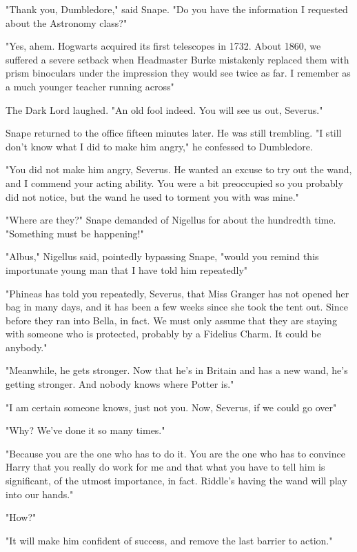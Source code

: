 "Thank you, Dumbledore," said Snape. "Do you have the information I requested about the Astronomy class?"

"Yes, ahem. Hogwarts acquired its first telescopes in 1732. About 1860, we suffered a severe setback when Headmaster Burke mistakenly replaced them with prism binoculars under the impression they would see twice as far. I remember as a much younger teacher running across{\el}"

The Dark Lord laughed. "An old fool indeed. You will see us out, Severus."

Snape returned to the office fifteen minutes later. He was still trembling. "I still don't know what I did to make him angry," he confessed to Dumbledore.

"You did not make him angry, Severus. He wanted an excuse to try out the wand, and I commend your acting ability. You were a bit preoccupied so you probably did not notice, but the wand he used to torment you with was mine."

\sbreak

"Where are they?" Snape demanded of Nigellus for about the hundredth time. "Something must be happening!"

"Albus," Nigellus said, pointedly bypassing Snape, "would you remind this importunate young man that I have told him repeatedly{\el}"

"Phineas has told you repeatedly, Severus, that Miss Granger has not opened her bag in many days, and it has been a few weeks since she took the tent out. Since before they ran into Bella, in fact. We must only assume that they are staying with someone who is protected, probably by a Fidelius Charm. It could be anybody."

"Meanwhile, he gets stronger. Now that he's in Britain and has a new wand, he's getting stronger. And nobody knows where Potter is."

"I am certain someone knows, just not you. Now, Severus, if we could go over{\el}"

"Why? We've done it so many times."

"Because you are the one who has to do it. You are the one who has to convince Harry that you really do work for me and that what you have to tell him is significant, of the utmost importance, in fact. Riddle's having the wand will play into our hands."

"How?"

"It will make him confident of success, and remove the last barrier to action."

